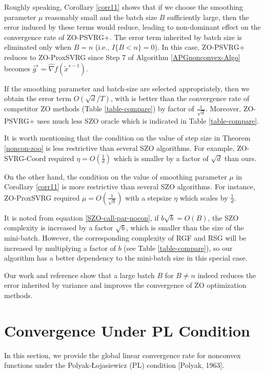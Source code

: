 \documentclass{article}
\theoremstyle{definition}
\theoremstyle{remark}
\begin{document}
Roughly speaking, Corollary \ref{corr11} shows  that if we choose the smoothing parameter $\mu$ reasonably small and the batch size $B$ sufficiently large, then the error induced by these terms would reduce, leading to non-dominant effect on the convergence rate of ZO-PSVRG+.
The error term inherited by batch size  is eliminated only when $B = n$  (i.e., $I\{B < n\} = 0$). In
this case, ZO-PSVRG+ reduces to ZO-ProxSVRG since Step 7 of Algorithm \ref{APGnonconvex-Algo} becomes $\hat{g}^s = \hat{\nabla} f(\widetilde{x}^{s-1})$. 

If the smoothing parameter and batch-size are selected appropriately, then we obtain the error term $O(\sqrt{d}/T)$, with is better than the convergence rate of competitor ZO methods (Table \ref{table-compare}) by factor of $\frac{1}{\sqrt{d}}$. Moreover, ZO-PSVRG+ uses much less SZO oracle which is indicated in Table \ref{table-compare}.

It is worth mentioning that the condition on the value of step size in Theorem \ref{noncon-zoo} is less restrictive than several SZO algorithms. For example, ZO-SVRG-Coord required $\eta = O(\frac{1}{d})$ which is smaller by a factor of $\sqrt{d}$ than ours. 

{\color{Brown}On the other hand, the condition on the value of smoothing parameter $\mu$ in Corollary \ref{corr11} is more restrictive than several SZO algorithms. For instance, ZO-ProxSVRG required $\mu= O(\frac{1}{\sqrt{d}})$ with a stepsize $\eta$ which scales by $\frac{1}{d}$.}


{\color{Green}
It is noted from equation \eqref{SZO-call-par-nocon},  if ${b\sqrt{b}} = O(B)$, the SZO complexity is increased by a factor $\sqrt{b}$, which is smaller than the size of the mini-batch. However, the corresponding complexity of RGF and RSG will be increased by multiplying
a factor of $b$ (see Table \ref{table-compare}), so our algorithm has a better dependency to the mini-batch size in this special case.

}
{\color{Brown}
Our work and reference \cite{} show that a large batch $B$  for $B \neq n$ indeed reduces the error inherited by variance and improves the convergence of ZO optimization methods.
}
\section{Convergence Under PL Condition}
{\color{Violet} In this section, we provide the global linear convergence rate for nonconvex functions under the Polyak-Łojasiewicz
(PL) condition [Polyak, 1963].}
\end{document}
